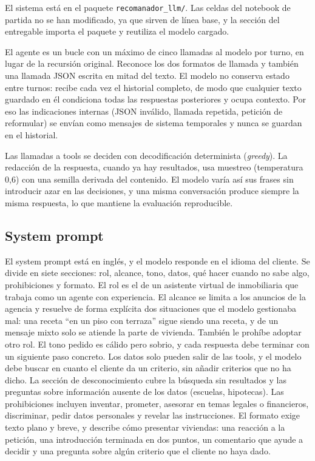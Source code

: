 \documentclass[10pt,a4paper]{article}
\begin{document}
El sistema está en el paquete \texttt{recomanador\_llm/}. Las celdas del notebook de partida no se han modificado, ya que sirven de línea base, y la sección del entregable importa el paquete y reutiliza el modelo cargado.

El agente es un bucle con un máximo de cinco llamadas al modelo por turno, en lugar de la recursión original. Reconoce los dos formatos de llamada y también una llamada JSON escrita en mitad del texto. El modelo no conserva estado entre turnos: recibe cada vez el historial completo, de modo que cualquier texto guardado en él condiciona todas las respuestas posteriores y ocupa contexto. Por eso las indicaciones internas (JSON inválido, llamada repetida, petición de reformular) se envían como mensajes de sistema temporales y nunca se guardan en el historial.

Las llamadas a tools se deciden con decodificación determinista (\emph{greedy}). La redacción de la respuesta, cuando ya hay resultados, usa muestreo (temperatura 0,6) con una semilla derivada del contenido. El modelo varía así sus frases sin introducir azar en las decisiones, y una misma conversación produce siempre la misma respuesta, lo que mantiene la evaluación reproducible.

\subsection{System prompt}

El system prompt está en inglés, y el modelo responde en el idioma del cliente. Se divide en siete secciones: rol, alcance, tono, datos, qué hacer cuando no sabe algo, prohibiciones y formato. El rol es el de un asistente virtual de inmobiliaria que trabaja como un agente con experiencia. El alcance se limita a los anuncios de la agencia y resuelve de forma explícita dos situaciones que el modelo gestionaba mal: una receta ``en un piso con terraza'' sigue siendo una receta, y de un mensaje mixto solo se atiende la parte de vivienda. También le prohíbe adoptar otro rol. El tono pedido es cálido pero sobrio, y cada respuesta debe terminar con un siguiente paso concreto. Los datos solo pueden salir de las tools, y el modelo debe buscar en cuanto el cliente da un criterio, sin añadir criterios que no ha dicho. La sección de desconocimiento cubre la búsqueda sin resultados y las preguntas sobre información ausente de los datos (escuelas, hipotecas). Las prohibiciones incluyen inventar, prometer, asesorar en temas legales o financieros, discriminar, pedir datos personales y revelar las instrucciones. El formato exige texto plano y breve, y describe cómo presentar viviendas: una reacción a la petición, una introducción terminada en dos puntos, un comentario que ayude a decidir y una pregunta sobre algún criterio que el cliente no haya dado.
\end{document}
